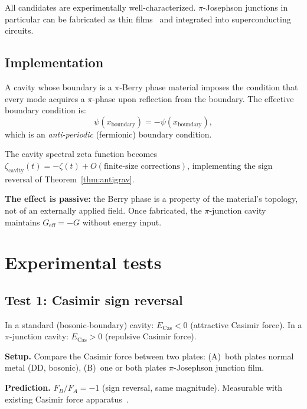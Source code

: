 \documentclass[aps,prl,twocolumn,superscriptaddress,nofootinbib]{revtex4-2}
\begin{document}
All candidates are experimentally well-characterized.
$\pi$-Josephson junctions in particular can be fabricated as
thin films~\cite{Ryazanov2001} and integrated into
superconducting circuits.

\subsection{Implementation}

A cavity whose boundary is a $\pi$-Berry phase material
imposes the condition that every mode acquires a $\pi$-phase
upon reflection from the boundary.
The effective boundary condition is:
\begin{equation}
  \psi(x_{\mathrm{boundary}}) = -\psi(x_{\mathrm{boundary}}),
\end{equation}
which is an \emph{anti-periodic} (fermionic) boundary condition.

The cavity spectral zeta function becomes
$\zeta_{\mathrm{cavity}}(t) = -\zeta(t) + O(\text{finite-size corrections})$,
implementing the sign reversal of Theorem~\ref{thm:antigrav}.

\textbf{The effect is passive:}
the Berry phase is a property of the material's topology,
not of an externally applied field.
Once fabricated, the $\pi$-junction cavity maintains
$G_{\mathrm{eff}} = -G$ without energy input.

\section{Experimental tests}

\subsection{Test 1: Casimir sign reversal}

In a standard (bosonic-boundary) cavity:
$E_{\mathrm{Cas}} < 0$ (attractive Casimir force).
In a $\pi$-junction cavity:
$E_{\mathrm{Cas}} > 0$ (repulsive Casimir force).

\textbf{Setup.}
Compare the Casimir force between two plates:
(A)~both plates normal metal (DD, bosonic),
(B)~one or both plates $\pi$-Josephson junction film.

\textbf{Prediction.}
$F_B / F_A = -1$ (sign reversal, same magnitude).
Measurable with existing Casimir force apparatus~\cite{Lamoreaux1997}.
\end{document}
